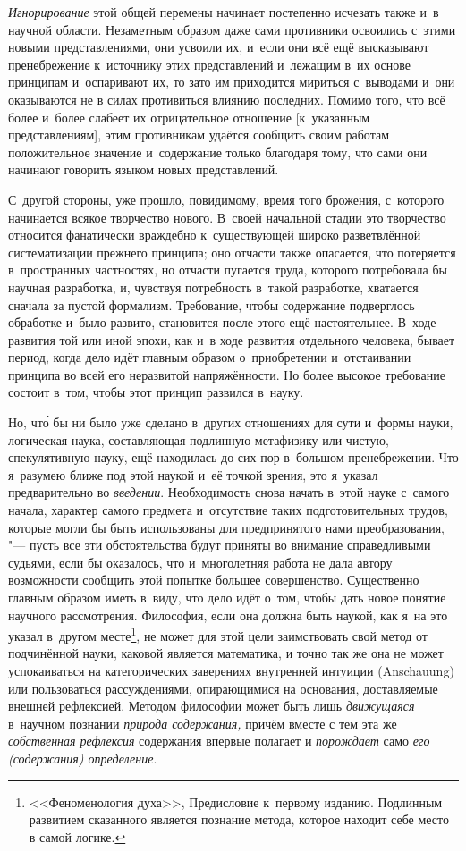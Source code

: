 {\em Игнорирование} этой общей перемены начинает постепенно исчезать также и~в
научной области. Незаметным образом даже сами противники освоились с~этими
новыми представлениями, они усвоили их, и~если они всё ещё высказывают пренебрежение
к~источнику этих представлений и~лежащим в~их основе принципам и~оспаривают
их, то зато им приходится мириться с~выводами и~они оказываются не в
силах противиться влиянию последних. Помимо того, что всё более и~более слабеет
их отрицательное отношение [к~указанным представлениям], этим противникам удаётся
сообщить своим работам положительное значение и~содержание только благодаря
тому, что сами они начинают говорить языком новых представлений.

С~другой стороны, уже прошло, повидимому, время того брожения, с~которого
начинается всякое творчество нового. В~своей начальной стадии это творчество
относится фанатически враждебно к~существующей широко разветвлённой
систематизации прежнего принципа; оно отчасти также опасается, что потеряется
в~пространных частностях, но отчасти пугается труда, которого потребовала бы
научная разработка, и, чувствуя потребность в~такой разработке, хватается
сначала за пустой формализм. Требование, чтобы содержание подверглось обработке
и~было развито, становится после этого ещё настоятельнее. В~ходе развития той
или иной эпохи, как и~в ходе развития отдельного человека, бывает период, когда
дело идёт главным образом о~приобретении и~отстаивании принципа во всей его
неразвитой напряжённости. Но более высокое требование состоит в~том, чтобы этот
принцип развился в~науку.

Но, чт\'{о} бы ни было уже сделано в~других отношениях для сути и~формы науки,
логическая наука, составляющая подлинную метафизику или чистую, спекулятивную
науку, ещё находилась до сих пор в~большом пренебрежении. Что я~разумею ближе
под этой наукой и~её точкой зрения, это я~указал предварительно во
{\em введении}. Необходимость снова начать в~этой науке с~самого начала,
характер самого предмета и~отсутствие таких подготовительных трудов, которые
могли бы быть использованы для предпринятого нами преобразования, "--- пусть
все эти обстоятельства будут приняты во внимание справедливыми судьями, если бы
оказалось, что и~многолетняя работа не дала автору возможности сообщить этой
попытке большее совершенство. Существенно главным образом иметь в~виду, что
дело идёт о~том, чтобы дать новое понятие научного рассмотрения. Философия,
если она должна быть наукой, как я~на это указал в~другом
месте\footnote{<<Феноменология духа>>, Предисловие к~первому изданию. Подлинным
развитием сказанного является познание метода, которое находит себе место в
самой логике.}, не может для этой цели
заимствовать свой метод от подчинённой науки, каковой является математика, и
точно так же она не может успокаиваться на категорических заверениях внутренней
интуиции (Anschauung) или пользоваться рассуждениями, опирающимися на
основания, доставляемые внешней рефлексией. Методом философии может быть лишь
{\em движущаяся} в~научном познании {\em природа содержания,} причём вместе с
тем эта же {\em собственная рефлексия} содержания впервые полагает и
{\em порождает} само {\em его (содержания) определение}.

